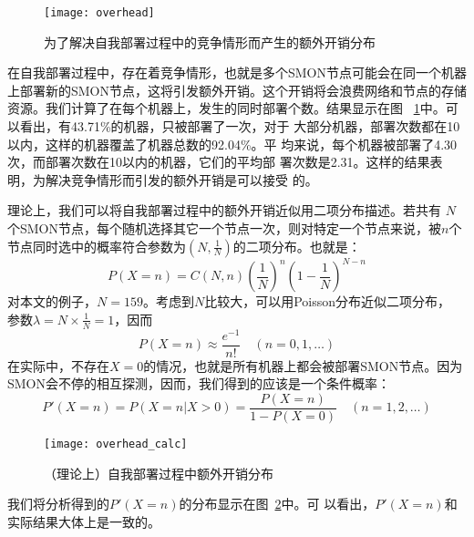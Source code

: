 \begin{figure}
\centering
  \begin{minipage}{0.8\linewidth}
    \centering
    \texttt{[image: overhead]}
    \caption{为了解决自我部署过程中的竞争情形而产生的额外开销分布}
    \label{fig:overhead}
  \end{minipage}
\end{figure}

在自我部署过程中，存在着竞争情形，也就是多个SMON节点可能会在同一个机器
上部署新的SMON节点，这将引发额外开销。这个开销将会浪费网络和节点的存储
资源。我们计算了在每个机器上，发生的同时部署个数。结果显示在图~
\ref{fig:overhead}中。可以看出，有43.71\%的机器，只被部署了一次，对于
大部分机器，部署次数都在10以内，这样的机器覆盖了机器总数的92.04\%。平
均来说，每个机器被部署了4.30次，而部署次数在10以内的机器，它们的平均部
署次数是2.31。这样的结果表明，为解决竞争情形而引发的额外开销是可以接受
的。

理论上，我们可以将自我部署过程中的额外开销近似用二项分布描述。若共有
$N$个SMON节点，每个随机选择其它一个节点一次，则对特定一个节点来说，被$n$个
节点同时选中的概率符合参数为$(N, \frac{1}{N})$的二项分布。也就是：
\begin{equation*}
P(X=n) = C(N, n) (\frac{1}{N})^n (1 - \frac{1}{N})^{N-n}
\end{equation*}
对本文的例子，$N=159$。考虑到$N$比较大，可以用Poisson分布近似二项分布，
参数$\lambda = N \times \frac{1}{N} = 1$，因而
\begin{equation*}
P(X=n) \approx \frac{e^{-1}}{n!} \quad (n = 0, 1, \ldots )
\end{equation*}
在实际中，不存在$X=0$的情况，也就是所有机器上都会被部署SMON节点。因为
SMON会不停的相互探测，因而，我们得到的应该是一个条件概率：
\begin{equation*}
P'(X=n) = P(X=n | X > 0) = \frac{P(X=n)}{1- P(X=0)} \quad (n = 1, 2, \ldots )
\end{equation*}

\begin{figure}
\centering
  \begin{minipage}{0.8\linewidth}
    \centering
    \texttt{[image: overhead\_calc]}
    \caption{（理论上）自我部署过程中额外开销分布}
    \label{fig:overhead_calc}
  \end{minipage}
\end{figure}

我们将分析得到的$P'(X=n)$的分布显示在图~\ref{fig:overhead_calc}中。可
以看出，$P'(X=n)$和实际结果大体上是一致的。

